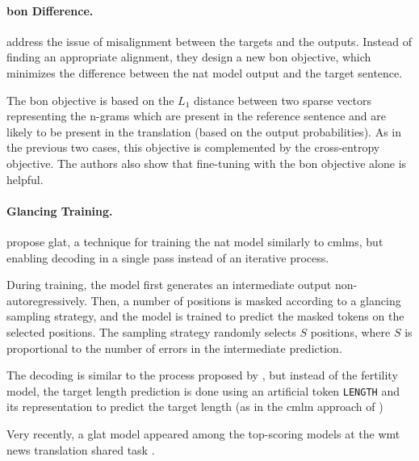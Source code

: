 \paragraph{\Acl{bon} Difference.} \citet{shao2020minimizing} address the
issue of misalignment between the targets and the outputs. Instead of finding
an appropriate alignment, they design a new \acf{bon} objective,
which minimizes the difference between the \ac{nat} model output and the target
sentence.

The \ac{bon} objective is based on the $L_1$ distance between two sparse
vectors representing the n-grams which are present in the reference sentence
and are likely to be present in the translation (based on the output
probabilities). As in the previous two cases, this objective is complemented by
the cross-entropy objective. The authors also show that fine-tuning with the
\ac{bon} objective alone is helpful.

\paragraph{Glancing Training.} \citet{qian-etal-2021-glancing} propose
\acf{glat}, a technique for training the \ac{nat} model
similarly to \acp{cmlm}, but enabling decoding in a single pass instead of an
iterative process.

During training, the model first generates an intermediate output
non-autoregressively. Then, a number of positions is masked according to a
glancing sampling strategy, and the model is trained to predict the masked
tokens on the selected positions. The sampling strategy randomly selects $S$
positions, where $S$ is proportional to the number of errors in the
intermediate prediction.

The decoding is similar to the process proposed by
\citet{gu2017nonautoregressive}, but instead of the fertility model, the target
length prediction is done using an artificial token \texttt{LENGTH} and its
representation to predict the target length (as in the \ac{cmlm} approach of
\citealp{ghazvininejad-etal-2019-mask})

Very recently, a \ac{glat} model appeared among the top-scoring models at the
\acs{wmt} news translation shared task \citep{qian2021volctrans}. 



